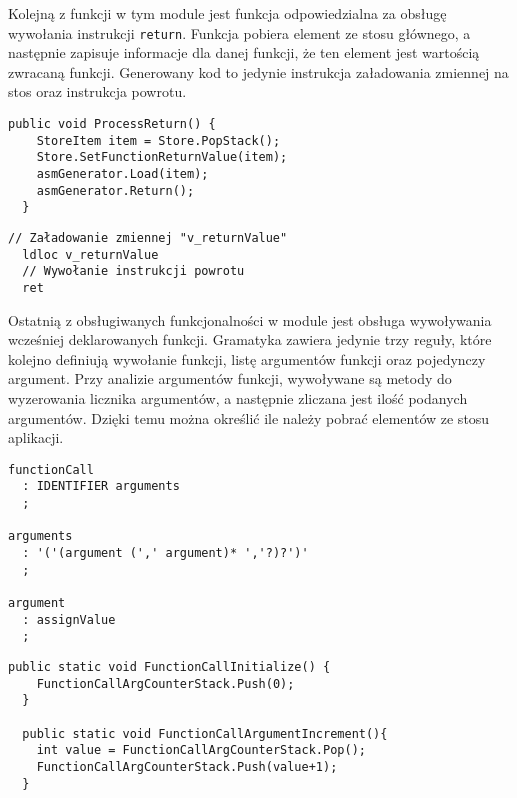 \par Kolejną z funkcji w tym module jest funkcja odpowiedzialna za obsługę wywołania instrukcji \texttt{return}. Funkcja pobiera element ze stosu głównego, a następnie zapisuje informacje dla danej funkcji, że ten element jest wartością zwracaną funkcji. Generowany kod to jedynie instrukcja załadowania zmiennej na stos oraz instrukcja powrotu.

\begin{lstlisting}[language=CSharp, caption={Implementacja funkcji obsługującej wywołanie \texttt{return}}, label=alg:f1]
  public void ProcessReturn() {
    StoreItem item = Store.PopStack();
    Store.SetFunctionReturnValue(item);
    asmGenerator.Load(item);
    asmGenerator.Return();
  }
\end{lstlisting}

\begin{lstlisting}[language=IL, caption={Kod assemblera przedstawiający zwracanie elementu}, label=alg:f1]
  // Załadowanie zmiennej "v_returnValue"
  ldloc v_returnValue
  // Wywołanie instrukcji powrotu
  ret
\end{lstlisting}

\par Ostatnią z obsługiwanych funkcjonalności w module jest obsługa wywoływania wcześniej deklarowanych funkcji. Gramatyka zawiera jedynie trzy reguły, które kolejno definiują wywołanie funkcji, listę argumentów funkcji oraz pojedynczy argument. Przy analizie argumentów funkcji, wywoływane są metody do wyzerowania licznika argumentów, a następnie zliczana jest ilość podanych argumentów. Dzięki temu można określić ile należy pobrać elementów ze stosu aplikacji.


\begin{lstlisting}[caption=Definicja gramatyki dla wywołania funkcji z arguemntami, label=alg:gramar]
functionCall
  : IDENTIFIER arguments
  ;

arguments
  : '('(argument (',' argument)* ','?)?')'
  ;

argument
  : assignValue
  ;
\end{lstlisting}


\begin{lstlisting}[language=CSharp, caption={Implementacja funkcji w klasie \texttt{Store} do zliczania argumentów funkcji}, label=alg:cs]
  public static void FunctionCallInitialize() {
    FunctionCallArgCounterStack.Push(0);
  }
  
  public static void FunctionCallArgumentIncrement(){
    int value = FunctionCallArgCounterStack.Pop();
    FunctionCallArgCounterStack.Push(value+1);
  }
\end{lstlisting}

